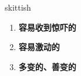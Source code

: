 
\begin{frame}
{\huge skittish}
\begin{center}
\begin{enumerate}\Large
  \item \textbf{容易收到惊吓的}
  \item \textbf{容易激动的}
  \item \textbf{多变的、善变的}
\end{enumerate}
\end{center}
\end{frame}
